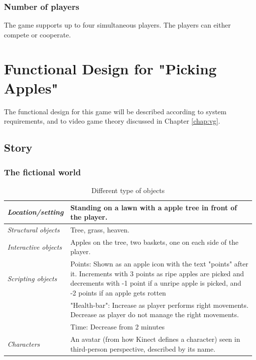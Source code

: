 \subsubsection{Number of players}
The game supports up to four simultaneous players. The players can either compete or cooperate.

\section{Functional Design for "Picking Apples"}
\label{sec:funcdesignapple}
The functional design for this game will be described according to system requirements, and to video game theory discussed in Chapter \ref{chap:vg}.

\subsection{Story}

\subsubsection{The fictional world} 

\begin{table} [H]
\centering
    \begin{tabular}{|p{}|p{}|}
       \hline
        \emph{Location/setting} & Standing on a lawn with a apple tree in front of the player. \\ \hline
       \emph{Structural objects} & Tree, grass, heaven.  \\ \hline
       \emph{Interactive objects} & Apples on the tree, two baskets, one on each side of the player. \\ \hline
	   \emph{Scripting objects} &  Points: Shown as an apple icon with the text "points" after it. Increments with 3 points as ripe apples are picked and decrements with -1 point if a unripe apple is picked, and -2 points if an apple gets rotten \\ \cline{2-2}
	   & "Health-bar": Increase as player performs right  movements. Decrease as player do not manage the right  movements.  \\ \cline{2-2}
	   & Time: Decrease from 2 minutes \\ \hline
	   \emph{Characters} & An avatar (from how Kinect defines a character) seen in third-person perspective, described by its name. \\ \hline
    \end{tabular}
    \caption[Various objects in the "Picking Apples" game]{Different type of objects}
    \label{tab:objects2}
\end{table}  
 
